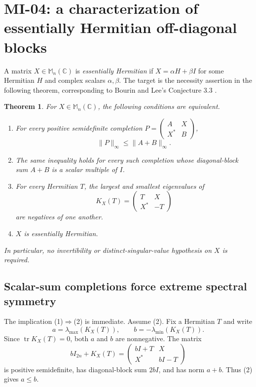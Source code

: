 \documentclass[10pt,a4paper]{article}
\newtheorem{theorem}{Theorem}[section]
\theoremstyle{remark}
\newcommand{\M}{\mathbb M}
\newcommand{\C}{\mathbb C}
\newcommand{\tr}{\operatorname{tr}}
\newcommand{\opnorm}[1]{\lVert #1\rVert_{\infty}}
\begin{document}
\section{MI-04: a characterization of essentially Hermitian off-diagonal blocks}
\label{sec:mi04}

A matrix $X\in\M_n(\C)$ is \emph{essentially Hermitian} if
$X=\alpha H+\beta I$ for some Hermitian $H$ and complex scalars $\alpha,\beta$.
The target is the necessity assertion in the following theorem, corresponding to Bourin and Lee's Conjecture 3.3 \cite{BL2021}.

\begin{theorem}\label{thm:mi04}
For $X\in\M_n(\C)$, the following conditions are equivalent.
\begin{enumerate}
\item For every positive semidefinite completion
$P=\begin{pmatrix}A&X\\X^*&B\end{pmatrix}$,
\[
 \opnorm{P}\leq\opnorm{A+B}.
\]
\item The same inequality holds for every such completion whose diagonal-block sum $A+B$ is a scalar multiple of $I$.
\item For every Hermitian $T$, the largest and smallest eigenvalues of
\[
 K_X(T)=\begin{pmatrix}T&X\\X^*&-T\end{pmatrix}
\]
are negatives of one another.
\item $X$ is essentially Hermitian.
\end{enumerate}
In particular, no invertibility or distinct-singular-value hypothesis on $X$ is required.
\end{theorem}

\subsection{Scalar-sum completions force extreme spectral symmetry}

The implication (1)$\Rightarrow$(2) is immediate. Assume (2). Fix a Hermitian $T$ and write
\[
 a=\lambda_{\max}(K_X(T)),\qquad b=-\lambda_{\min}(K_X(T)).
\]
Since $\tr K_X(T)=0$, both $a$ and $b$ are nonnegative. The matrix
\[
 bI_{2n}+K_X(T)
 =\begin{pmatrix}bI+T&X\\X^*&bI-T\end{pmatrix}
\]
is positive semidefinite, has diagonal-block sum $2bI$, and has norm $a+b$. Thus (2) gives $a\leq b$.
\end{document}
